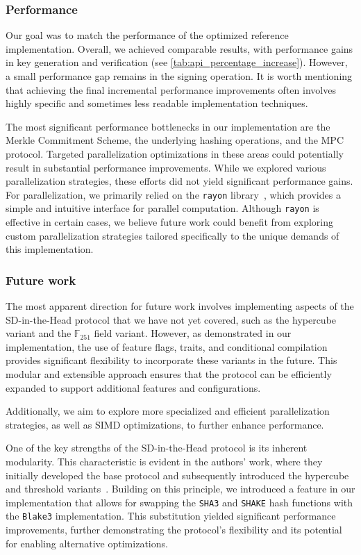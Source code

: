 \documentclass[11pt]{report}
\theoremstyle{definition}
\theoremstyle{plain}
\begin{document}
\subsubsection{Performance}

Our goal was to match the performance of the optimized reference implementation. Overall, we achieved comparable results, with performance gains in key generation and verification (see \autoref{tab:api_percentage_increase}). However, a small performance gap remains in the signing operation. It is worth mentioning that achieving the final incremental performance improvements often involves highly specific and sometimes less readable implementation techniques.

The most significant performance bottlenecks in our implementation are the Merkle Commitment Scheme, the underlying hashing operations, and the MPC protocol. Targeted parallelization optimizations in these areas could potentially result in substantial performance improvements. While we explored various parallelization strategies, these efforts did not yield significant performance gains. For parallelization, we primarily relied on the \texttt{rayon} library~\cite{rayon}, which provides a simple and intuitive interface for parallel computation. Although \texttt{rayon} is effective in certain cases, we believe future work could benefit from exploring custom parallelization strategies tailored specifically to the unique demands of this implementation.

\subsubsection{Future work}

The most apparent direction for future work involves implementing aspects of the SD-in-the-Head protocol that we have not yet covered, such as the hypercube variant and the $\mathbb{F}_{251}$ field variant. However, as demonstrated in our implementation, the use of feature flags, traits, and conditional compilation provides significant flexibility to incorporate these variants in the future. This modular and extensible approach ensures that the protocol can be efficiently expanded to support additional features and configurations.

Additionally, we aim to explore more specialized and efficient parallelization strategies, as well as SIMD optimizations, to further enhance performance. 

One of the key strengths of the SD-in-the-Head protocol is its inherent modularity. This characteristic is evident in the authors' work, where they initially developed the base protocol and subsequently introduced the hypercube and threshold variants~\cite{feneuil2023threshold,aguilar2023return}. Building on this principle, we introduced a feature in our implementation that allows for swapping the \texttt{SHA3} and \texttt{SHAKE} hash functions with the \texttt{Blake3} implementation. This substitution yielded significant performance improvements, further demonstrating the protocol's flexibility and its potential for enabling alternative optimizations.
\end{document}
